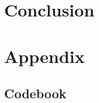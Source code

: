 \documentclass[
]{article}
\begin{document}
\hypertarget{conclusion}{%
\section{Conclusion}\label{conclusion}}

\hypertarget{appendix}{%
\section*{Appendix}\label{appendix}}

\hypertarget{codebook}{%
\subsection*{Codebook}\label{codebook}}
\end{document}
